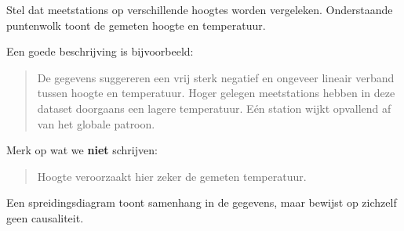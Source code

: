 \documentclass{ximera}
\begin{document}
\begin{voorbeeld}

  Stel dat meetstations op verschillende hoogtes worden vergeleken.
  Onderstaande puntenwolk toont de gemeten hoogte en temperatuur.
  
  \begin{center}
  \end{center}
  
  Een goede beschrijving is bijvoorbeeld:
  
  \begin{quote}
  De gegevens suggereren een vrij sterk negatief en ongeveer lineair
  verband tussen hoogte en temperatuur. Hoger gelegen meetstations
  hebben in deze dataset doorgaans een lagere temperatuur. Eén station
  wijkt opvallend af van het globale patroon.
  \end{quote}
  
  Merk op wat we \textbf{niet} schrijven:
  
  \begin{quote}
  Hoogte veroorzaakt hier zeker de gemeten temperatuur.
  \end{quote}
  
  Een spreidingsdiagram toont samenhang in de gegevens, maar bewijst
  op zichzelf geen causaliteit.
  
  \end{voorbeeld}
\end{document}
